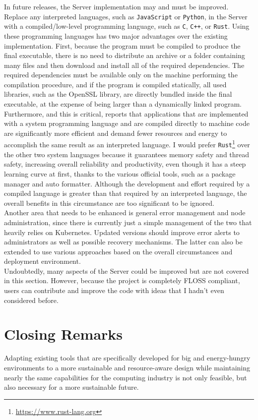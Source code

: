 In future releases, the Server implementation may and must be improved. \\ %
Replace any interpreted languages, such as \texttt{JavaScript} or \texttt{Python},
in the Server with a compiled/low-level programming language, such as \texttt{C},
\texttt{C++}, or \texttt{Rust}. Using these programming languages has two major advantages
over the existing implementation. First, because the program must be compiled to
produce the final executable, there is no need to distribute an archive or a
folder containing many files and then download and install all of the required
dependencies. The required dependencies must be available only on the machine performing
the compilation procedure, and if the program is compiled statically, all used libraries,
such as the OpenSSL library, are directly bundled inside the final executable,
at the expense of being larger than a dynamically linked program. Furthermore,
and this is critical, \cite{programming_languages_efficiency} reports that applications
that are implemented with a system programming language and are compiled directly
to machine code are significantly more efficient and demand fewer resources and energy
to accomplish the same result as an interpreted language. I would prefer \texttt{Rust}\footnote{\url{https://www.rust-lang.org}}
over the other two system languages because it guarantees memory safety and thread
safety, increasing overall reliability and productivity, even though it has a steep
learning curve at first, thanks to the various official tools, such as a package
manager and auto formatter. Although the development and effort required by a
compiled language is greater than that required by an interpreted language, the overall
benefits in this circumstance are too significant to be ignored. \\ %
Another area that needs to be enhanced is general error management and node administration,
since there is currently just a simple management of the two that heavily relies
on Kubernetes. Updated versions should improve error alerts to administrators as
well as possible recovery mechanisms. The latter can also be extended to use
various approaches based on the overall circumstances and deployment environment.
\\ %
Undoubtedly, many aspects of the Server could be improved but are not covered in
this section. However, because the project is completely FLOSS compliant, users
can contribute and improve the code with ideas that I hadn't even considered
before.

\section{Closing Remarks}
\label{sec:conclusions_closing_remarks}

Adapting existing tools that are specifically developed for big and energy-hungry
environments to a more sustainable and resource-aware design while maintaining nearly
the same capabilities for the computing industry is not only feasible, but also
necessary for a more sustainable future.